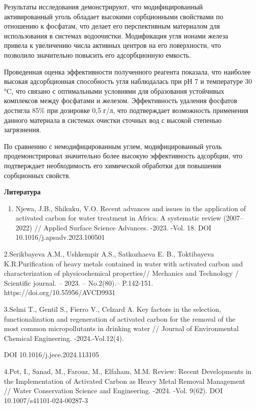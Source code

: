Результаты исследования демонстрируют, что модифицированный
активированный уголь обладает высокими сорбционными свойствами по
отношению к фосфатам, что делает его перспективным материалом для
использования в системах водоочистки. Модификация угля ионами железа
привела к увеличению числа активных центров на его поверхности, что
позволило значительно повысить его адсорбционную емкость.

Проведенная оценка эффективности полученного реагента показала, что
наиболее высокая адсорбционная способность угля наблюдалась при рН 7 и
температуре 30 °C, что связано с оптимальными условиями для образования
устойчивых комплексов между фосфатами и железом. Эффективность удаления
фосфатов достигла 85\% при дозировке 0,5 г/л, что подтверждает
возможность применения данного материала в системах очистки сточных вод
с высокой степенью загрязнения.

По сравнению с немодифицированным углем, модифицированный уголь
продемонстрировал значительно более высокую эффективность адсорбции, что
подтверждает необходимость его химической обработки для повышения
сорбционных свойств.

{\bfseries Литература}

\begin{enumerate}
\def\labelenumi{\arabic{enumi}.}
\item
  Njewa, J.B., Shikuku, V.O. Recent advances and issues in the
  application of activated carbon for water treatment in Africa: A
  systematic review (2007--2022) // Applied Surface Science Advances.
  -2023. -Vol. 18. DOI 10.1016/j.apsadv.2023.100501
\end{enumerate}

2.Serikbayeva A.M., Ushkempir A.S., Satkozhaeva E. B., Toktibayeva
K.R.Purification of heavy metals contained in water with activated
carbon and characterization of physicochemical properties// Mechanics
and Technology / Scientific journal. -- 2023. -- No.2(80).-- P.142-151.
https://doi.org/10.55956/AVCD9931

3.Selmi T., Gentil S., Fierro V., Celzard A. Key factors in the
selection, functionalization and regeneration of activated carbon for
the removal of the most common micropollutants in drinking water //
Journal of Environmental Chemical Engineering. -2024.-Vol.12(4).

DOI 10.1016/j.jece.2024.113105

4.Pet, I., Sanad, M., Farouz, M., Elfaham, M.M. Review: Recent
Developments in the Implementation of Activated Carbon as Heavy Metal
Removal Management // Water Conservation Science and Engineering. -2024.
-Vol. 9(62). DOI 10.1007/s41101-024-00287-3

